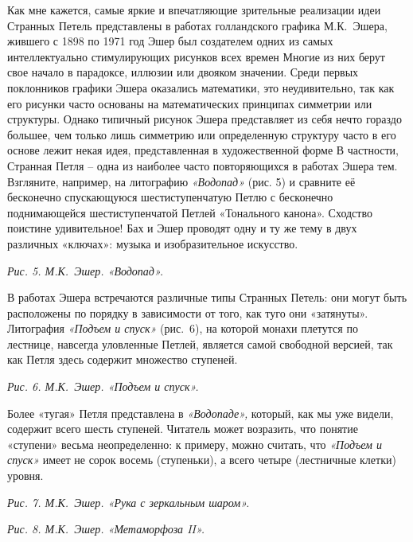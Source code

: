 \documentclass[../main.tex]{subfiles}
\begin{document}
Как мне кажется, самые яркие и впечатляющие зрительные реализации идеи Странных Петель представлены в работах голландского графика М.К.~Эшера, жившего с 1898 по 1971 год Эшер был создателем одних из самых интеллектуально стимулирующих рисунков всех времен Многие из них берут свое начало в парадоксе, иллюзии или двояком значении. Среди первых поклонников графики Эшера оказались математики, это неудивительно, так как его рисунки часто основаны на математических принципах симметрии или структуры. Однако типичный рисунок Эшера представляет из себя нечто гораздо большее, чем только лишь симметрию или определенную структуру часто в его основе лежит некая идея, представленная в художественной форме В частности, Странная Петля \--- одна из наиболее часто повторяющихся в работах Эшера тем. Взгляните, например, на литографию \emph{«Водопад»} (рис. 5) и сравните её бесконечно спускающуюся шестиступенчатую Петлю с бесконечно поднимающейся шестиступенчатой Петлей «Тонального канона». Сходство поистине удивительное! Бах и Эшер проводят одну и ту же тему в двух различных «ключах»: музыка и изобразительное искусство.

\emph{Рис. 5. М.К.~Эшер. «Водопад».}

В работах Эшера встречаются различные типы Странных Петель: они могут быть расположены по порядку в зависимости от того, как туго они «затянуты». Литография \emph{«Подъем и спуск»} (рис.~6), на которой монахи плетутся по лестнице, навсегда уловленные Петлей, является самой свободной версией, так как Петля здесь содержит множество ступеней.

\emph{Рис. 6. М.К.~Эшер. «Подъем и спуск».}

Более «тугая» Петля представлена в \emph{«Водопаде»,} который, как мы уже видели, содержит всего шесть ступеней. Читатель может возразить, что понятие «ступени» весьма неопределенно: к примеру, можно считать, что \emph{«Подъем и спуск»} имеет не сорок восемь (ступеньки), а всего четыре (лестничные клетки) уровня.

\emph{Рис. 7. М.К.~Эшер. «Рука с зеркальным шаром».}

\emph{Рис. 8. М.К.~Эшер. «Метаморфоза II».}
\end{document}

